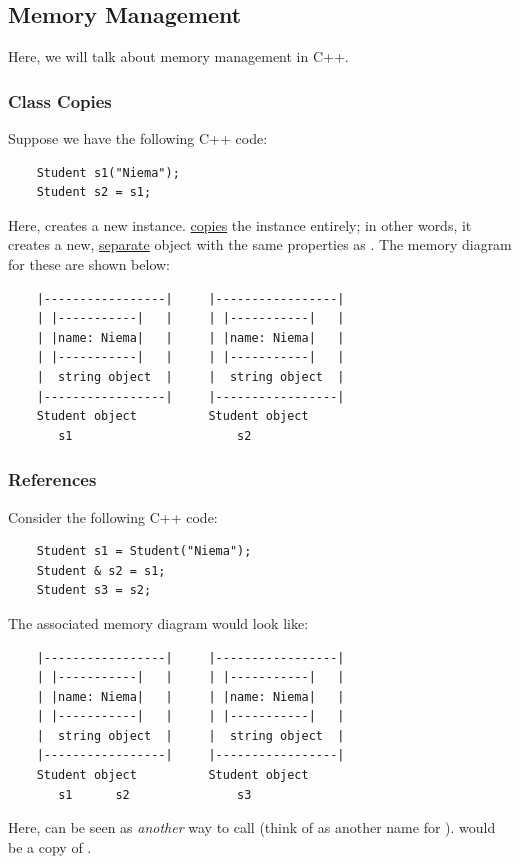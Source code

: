 \documentclass[letterpaper]{article}
\begin{document}
\subsection{Memory Management}
Here, we will talk about memory management in C++. 

\subsubsection{Class Copies}
Suppose we have the following C++ code:
\begin{verbatim}
    Student s1("Niema");
    Student s2 = s1;
\end{verbatim}
Here,  creates a new  instance.  \underline{copies} the  instance entirely; in other words, it creates a new, \underline{separate} object with the same properties as . The memory diagram for these are shown below: 
\begin{verbatim}
    |-----------------|     |-----------------|
    | |-----------|   |     | |-----------|   |
    | |name: Niema|   |     | |name: Niema|   |
    | |-----------|   |     | |-----------|   |
    |  string object  |     |  string object  |
    |-----------------|     |-----------------|
    Student object          Student object
       s1                       s2
\end{verbatim} 

\subsubsection{References}
Consider the following C++ code: 
\begin{verbatim}
    Student s1 = Student("Niema");
    Student & s2 = s1;
    Student s3 = s2;
\end{verbatim}
The associated memory diagram would look like: 
\begin{verbatim}
    |-----------------|     |-----------------|
    | |-----------|   |     | |-----------|   |
    | |name: Niema|   |     | |name: Niema|   |
    | |-----------|   |     | |-----------|   |
    |  string object  |     |  string object  |
    |-----------------|     |-----------------|
    Student object          Student object 
       s1      s2               s3
\end{verbatim} 
Here,  can be seen as \emph{another} way to call  (think of  as another name for ).  would be a copy of . 
\end{document}
